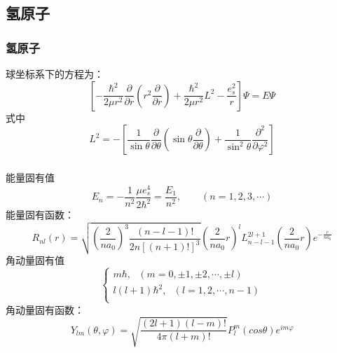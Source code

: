 \subsection{氢原子}

\begin{frame}
    \frametitle{氢原子}
    球坐标系下的方程为：
	\begin{equation*}
		\left[-\frac{\hbar^2}{2 \mu r^2}  \frac{\partial }{\partial r} (r^2\frac{\partial }{\partial r} ) +  \frac{\hbar ^2 }{2 \mu r^2} L^2  -\frac{e_s ^2}{r} \right] \Psi
		=E\Psi
	\end{equation*}	
    式中
    \begin{equation*}
		L^2 =  -\left[ \frac{1}{ \sin \theta  } \frac{\partial }{\partial \theta } (\sin \theta \frac{\partial }{\partial \theta } )
		+\frac{1}{ \sin^2 \theta  } \frac{\partial^2}{\partial\varphi ^2} \right]
	\end{equation*}	
\end{frame}

\begin{frame}
      \frametitle{}
    能量固有值
      \[ E_n =- \frac{1}{n^2} \frac{\mu e^4 _s }{2 \hbar ^2} =\frac{E_1}{n^2}, \qquad (n=1,2,3,\cdots) \]
    能量固有函数：
      \[
          R_{nl} (r) =\sqrt{(\frac{2}{n a_0})^3 \frac{ (n-l-1)!}{2n [(n+1)!]^3}}  (\frac{2}{n a_0}r) ^l  L_{n-l-1} ^{2l+1} (\frac{2}{n a_0}r) e^{-\frac{r}{n a_0}}\]
    角动量固有值
          \[\begin{cases}
              m\hbar, ~~~ (m=0,\pm 1,\pm 2,\cdots,\pm l) \\
              l(l+1)\hbar^2, ~~~ (l=1, 2,\cdots, n-1) \\ 
          \end{cases}\]
    角动量固有函数：
          \[
              Y_{lm} (\theta,\varphi)= \sqrt{\frac{(2l+1)(l-m)!}{4\pi (l+m)!}}  P_l ^m (cos \theta)  e^{im\varphi}  \]
\end{frame}

